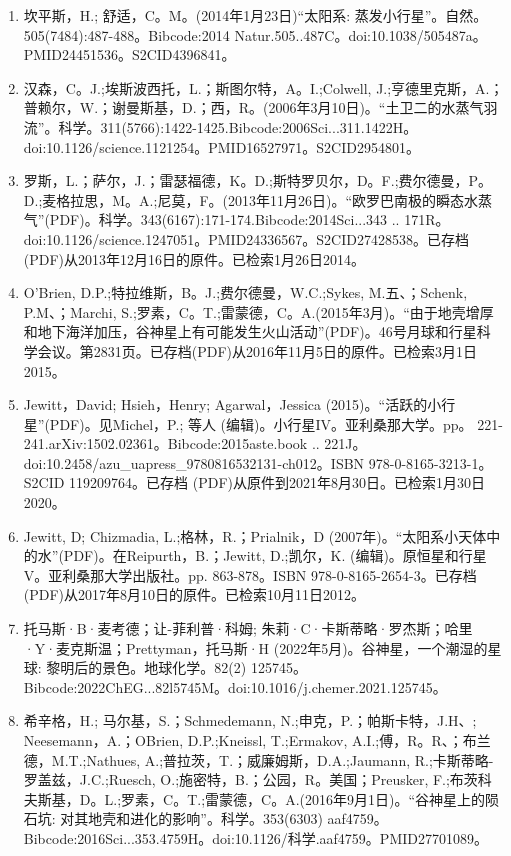 \begin{enumerate}
\item 坎平斯，H.; 舒适，C。M。(2014年1月23日)“太阳系: 蒸发小行星”。自然。505(7484):487-488。Bibcode:2014 Natur.505..487C。doi:10.1038/505487a。PMID24451536。S2CID4396841。  
\item 汉森，C。J.;埃斯波西托，L.；斯图尔特，A。I.;Colwell, J.;亨德里克斯，A.；普赖尔，W.；谢曼斯基，D.；西，R。(2006年3月10日)。“土卫二的水蒸气羽流”。科学。311(5766):1422-1425.Bibcode:2006Sci...311.1422H。doi:10.1126/science.1121254。PMID16527971。S2CID2954801。  
\item 罗斯，L.；萨尔，J.；雷瑟福德，K。D.;斯特罗贝尔，D。F.;费尔德曼，P。D.;麦格拉思，M。A.;尼莫，F。(2013年11月26日)。“欧罗巴南极的瞬态水蒸气”(PDF)。科学。343(6167):171-174.Bibcode:2014Sci...343 .. 171R。doi:10.1126/science.1247051。PMID24336567。S2CID27428538。已存档(PDF)从2013年12月16日的原件。已检索1月26日2014。   
\item O'Brien, D.P.;特拉维斯，B。J.;费尔德曼，W.C.;Sykes, M.五、；Schenk, P.M、；Marchi, S.;罗素，C。T.;雷蒙德，C。A.(2015年3月)。“由于地壳增厚和地下海洋加压，谷神星上有可能发生火山活动”(PDF)。46号月球和行星科学会议。第2831页。已存档(PDF)从2016年11月5日的原件。已检索3月1日2015。
\item Jewitt，David; Hsieh，Henry; Agarwal，Jessica (2015)。“活跃的小行星”(PDF)。见Michel，P.; 等人 (编辑)。小行星IV。亚利桑那大学。pp。 221-241.arXiv:1502.02361。Bibcode:2015aste.book .. 221J。doi:10.2458/azu_uapress_9780816532131-ch012。ISBN  978-0-8165-3213-1。S2CID 119209764。已存档 (PDF)从原件到2021年8月30日。已检索1月30日2020。
\item Jewitt, D; Chizmadia, L.;格林，R.；Prialnik，D (2007年)。“太阳系小天体中的水”(PDF)。在Reipurth，B.；Jewitt, D.;凯尔，K. (编辑)。原恒星和行星V。亚利桑那大学出版社。pp. 863-878。ISBN  978-0-8165-2654-3。已存档 (PDF)从2017年8月10日的原件。已检索10月11日2012。
\item 托马斯·B·麦考德；让-菲利普·科姆; 朱莉·C·卡斯蒂略·罗杰斯；哈里·Y·麦克斯温；Prettyman，托马斯·H (2022年5月)。谷神星，一个潮湿的星球: 黎明后的景色。地球化学。82(2) 125745。Bibcode:2022ChEG...82l5745M。doi:10.1016/j.chemer.2021.125745。
\item 希辛格，H.; 马尔基，S.；Schmedemann, N.;申克，P.；帕斯卡特，J.H、; Neesemann，A.；OBrien, D.P.;Kneissl, T.;Ermakov, A.I.;傅，R。R、；布兰德，M.T.;Nathues, A.;普拉茨，T.；威廉姆斯，D.A.;Jaumann, R.;卡斯蒂略-罗盖兹，J.C.;Ruesch, O.;施密特，B.；公园，R。美国；Preusker, F.;布茨科夫斯基，D。L.;罗素，C。T.;雷蒙德，C。A.(2016年9月1日)。“谷神星上的陨石坑: 对其地壳和进化的影响”。科学。353(6303) aaf4759。Bibcode:2016Sci...353.4759H。doi:10.1126/科学.aaf4759。PMID27701089。 

\end{enumerate}
